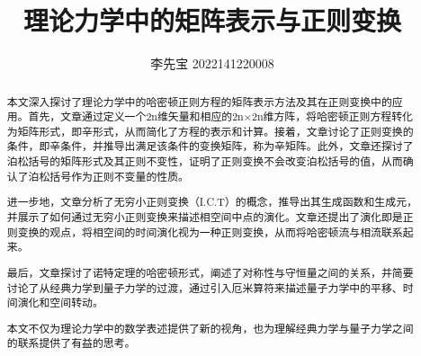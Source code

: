 \documentclass[12pt]{ctexart}
\author{李先宝 2022141220008}
\date{}
\title{理论力学中的矩阵表示与正则变换}
\begin{document}
\maketitle
\begin{abstract}
    本文深入探讨了理论力学中的哈密顿正则方程的矩阵表示方法及其在正则变换中的应用。首先，文章通过定义一个2n维矢量和相应的2n×2n维方阵，将哈密顿正则方程转化为矩阵形式，即辛形式，从而简化了方程的表示和计算。接着，文章讨论了正则变换的条件，即辛条件，并推导出满足该条件的变换矩阵，称为辛矩阵。此外，文章还探讨了泊松括号的矩阵形式及其正则不变性，证明了正则变换不会改变泊松括号的值，从而确认了泊松括号作为正则不变量的性质。

进一步地，文章分析了无穷小正则变换（I.C.T）的概念，推导出其生成函数和生成元，并展示了如何通过无穷小正则变换来描述相空间中点的演化。文章还提出了演化即是正则变换的观点，将相空间的时间演化视为一种正则变换，从而将哈密顿流与相流联系起来。

最后，文章探讨了诺特定理的哈密顿形式，阐述了对称性与守恒量之间的关系，并简要讨论了从经典力学到量子力学的过渡，通过引入厄米算符来描述量子力学中的平移、时间演化和空间转动。

本文不仅为理论力学中的数学表述提供了新的视角，也为理解经典力学与量子力学之间的联系提供了有益的思考。

\end{abstract}
\newpage
\tableofcontents %
\newpage
\end{document}
